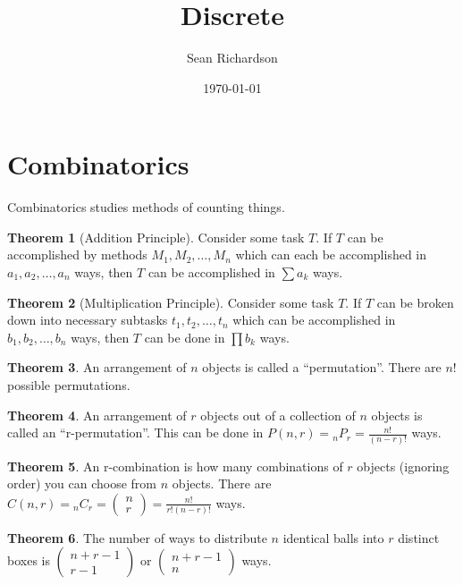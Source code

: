 \documentclass[11pt]{article}
\theoremstyle{definition}
\newtheorem{theorem}{Theorem}[section]
\begin{document}
\title{Discrete}
\author{Sean Richardson}
\date{\today}
\maketitle
\tableofcontents

\section{Combinatorics}

Combinatorics studies methods of counting things.

\begin{theorem}[Addition Principle]
    Consider some task $T$. If $T$ can be accomplished by methods $M_1,M_2,\dots,M_n$ which can each be accomplished in $a_1, a_2, \dots, a_n$ ways, then $T$ can be accomplished in $\sum a_k$ ways.
\end{theorem}
\begin{theorem}[Multiplication Principle]
    Consider some task $T$. If $T$ can be broken down into necessary subtasks $t_1,t_2,\dots,t_n$ which can be accomplished in $b_1,b_2,\dots,b_n$ ways, then $T$ can be done in $\prod b_k$ ways.
\end{theorem}
\begin{theorem}
    An arrangement of $n$ objects is called a ``permutation''. There are $n!$ possible permutations.
\end{theorem}
\begin{theorem}
    An arrangement of $r$ objects out of a collection of $n$ objects is called an ``r-permutation''. This can be done in $P(n,r)= {}_{n}P_r = \frac{n!}{(n-r)!}$ ways.
\end{theorem}
\begin{theorem}
    An r-combination is how many combinations of $r$ objects (ignoring order) you can choose from $n$ objects. There are $C(n,r)={}_{n}C_r=(\begin{smallmatrix}n \\ r \end{smallmatrix}) = \frac{n!}{r!(n-r)!}$ ways.
\end{theorem}
\begin{theorem}
    The number of ways to distribute $n$ identical balls into $r$ distinct boxes is $(\begin{smallmatrix} n+r-1 \\ r-1 \end{smallmatrix})$ or $(\begin{smallmatrix} n+r-1 \\ n \end{smallmatrix})$ ways.
\end{theorem}
\end{document}
